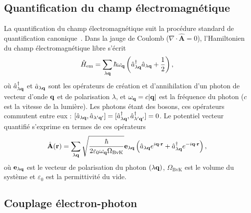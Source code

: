 \subsection{Quantification du champ électromagnétique}

La quantification du champ électromagnétique suit la procédure standard de quantification canonique~\cite{hegerfeldtPhotonsAtomsIntroduction1990}. Dans la jauge de Coulomb ($\nabla\cdot\hat{\mathbf{A}}=0$), l'Hamiltonien du champ électromagnétique libre s'écrit
\begin{equation}
    \hat{H}_\text{em} = \sum_{\lambda\mathbf{q}}\hbar\omega_{\mathbf{q}}\left(\hat{a}_{\lambda\mathbf{q}}^\dag\hat{a}_{\lambda\mathbf{q}}+\frac{1}{2}\right),
\end{equation}
où $\hat{a}^\dag_{\lambda\mathbf{q}}$ et $\hat{a}_{\lambda\mathbf{q}}$ sont les opérateurs de création et d'annihilation d'un photon de vecteur d'onde $\mathbf{q}$ et de polarisation $\lambda$, et $\omega_{\mathbf{q}}=c|\mathbf{q}|$ est la fréquence du photon ($c$ est la vitesse de la lumière). Les photons étant des bosons, ces opérateurs commutent entre eux : $[\hat{a}_{\lambda\mathbf{q}},\hat{a}_{\lambda'\mathbf{q}'}]=[\hat{a}_{\lambda\mathbf{q}}^\dag,\hat{a}^\dag_{\lambda'\mathbf{q}'}] = 0$. Le potentiel vecteur quantifié s'exprime en termes de ces opérateurs
\begin{equation}
    \hat{\mathbf{A}}(\mathbf{r})=\sum_{\lambda\mathbf{q}}\sqrt{\frac{\hbar}{2\varepsilon_0\omega_{\mathbf{q}} \Omega_\text{BvK}}}\mathbf{e}_{\lambda\mathbf{q}}\left(\hat{a}_{\lambda\mathbf{q}}e^{i\mathbf{q}\cdot\mathbf{r}}+\hat{a}^\dag_{\lambda\mathbf{q}}e^{-i\mathbf{q}\cdot\mathbf{r}}\right),
    \label{eqn:c2_A}
\end{equation}
où $\mathbf{e}_{\lambda\mathbf{q}}$ est le vecteur de polarisation du photon $(\lambda\mathbf{q})$, $\Omega_\text{BvK}$ est le volume du système et $\varepsilon_0$ est la permittivité du vide.

\subsection{Couplage électron-photon}

